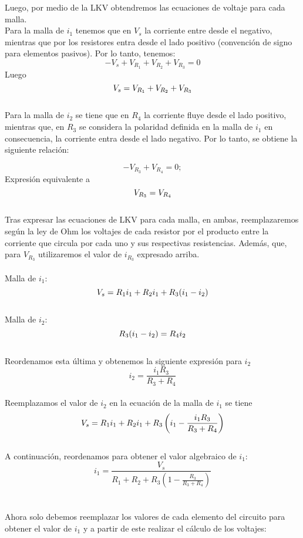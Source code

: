 \begin{example}
Luego, por medio de la LKV obtendremos las ecuaciones de voltaje para cada malla. 
\\Para la malla de $i_1$ tenemos que en $V_s$ la corriente entre desde el negativo, mientras que por los resistores entra desde el lado positivo (convención de signo para elementos pasivos). Por lo tanto, tenemos:\\
\begin {equation*}
 -V_s + V_{R_1} + V_{R_2} + V_{R_3} = 0
\end {equation*}
Luego
\begin {equation*}
\notag V_s=V_{R_1}+V_{R_2}+V_{R_3}
\end {equation*} \\Para la malla de $i_2$ se tiene que en $R_4$ la corriente fluye desde el lado positivo, mientras que, en $R_3$ se considera la polaridad definida en la malla de $i_1$ en consecuencia, la corriente entra desde el lado negativo. Por lo tanto, se obtiene la siguiente relación:

\begin {equation*}
 -V_{R_3} + V_{R_4} = 0;
\end {equation*}
Expresión equivalente a 
\begin {equation*}
\notag V_{R_3}=V_{R_4}
\end {equation*} \\
Tras expresar las ecuaciones de LKV para cada malla, en ambas, reemplazaremos según la ley de Ohm los voltajes de cada resistor por el producto entre la corriente que circula por cada uno y sus respectivas resistencias. Además, que, para $V_{R_3}$ utilizaremos el valor de $i_{R_3}$ expresado arriba.\\\\
Malla de $i_1$:
\begin {equation*}
\notag V_s=R_1 i_1+R_2 i_1+R_3(i_1-i_2)
\end {equation*}\\
Malla de $i_2$: 
\begin {equation*}
\notag R_3(i_1-i_2)=R_4 i_2
\end {equation*}\\Reordenamos esta última y obtenemos la siguiente expresión para $i_2$
\begin {equation*}
i_2 = \frac{i_1 R_3}{R_3+R_4}
\end {equation*}\\Reemplazamos el valor de $i_2$ en la ecuación de la malla de $i_1$ se tiene
\begin {equation*}
\notag V_s= R_1 i_1+R_2 i_1+R_3 \left(i_1-\frac{i_1 R_3}{R_3+R_4} \right)
\end {equation*}\\
A continuación, reordenamos para obtener el valor algebraico de $i_1$:
\begin {equation*}
i_1=\frac{V_s}{R_1+R_2+R_3\left(1-\frac{R_3}{R_3+R_4}\right)}
\end {equation*}\\\\
 Ahora solo debemos reemplazar los valores de cada elemento del circuito para obtener  el valor de $i_1$ y a partir de este realizar el cálculo de los voltajes:


\end{example}
